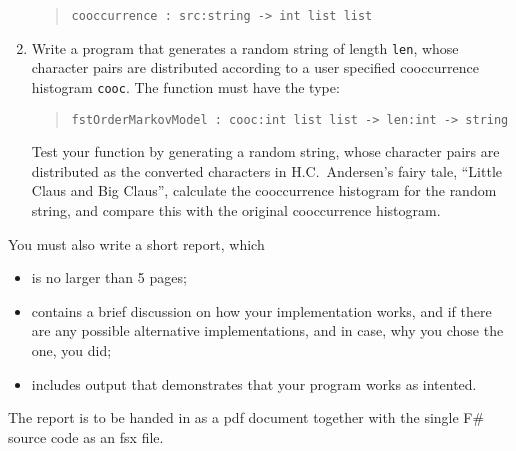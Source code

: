 \begin{enumerate}
\begin{quote}
    \mbox{\lstinline!cooccurrence : src:string -> int list list!}
  \end{quote}
\item Write a program that generates a random string of length
  \lstinline!len!, whose character pairs are distributed according to
  a user specified cooccurrence histogram \lstinline!cooc!.  The
  function must have the type:
  \begin{quote}
    \mbox{\lstinline!fstOrderMarkovModel : cooc:int list list -> len:int -> string!}
  \end{quote}
  Test your function by generating a random string, whose character
  pairs are distributed as the converted characters in H.C.\
  Andersen's fairy tale, ``Little Claus and Big Claus'', calculate the
  cooccurrence histogram for the random string, and compare this with
  the original cooccurrence histogram.
\end{enumerate}
You must also write a short report, which 
\begin{itemize}
\item is no larger than 5 pages;
\item contains a brief discussion on how your implementation works,
  and if there are any possible alternative implementations, and in
  case, why you chose the one, you did;
\item includes output that demonstrates that your program works as intented.
\end{itemize}
The report is to be handed in as a pdf document together with the
single F\# source code as an fsx file.
